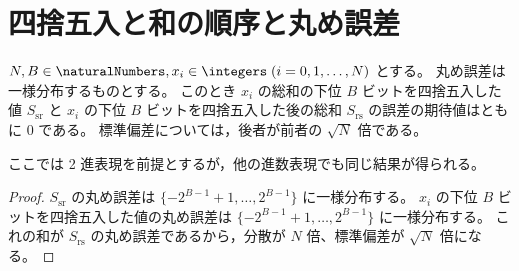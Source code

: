 \chapter{四捨五入と和の順序と丸め誤差}
    \begin{shadebox}
        $N,B\in\naturalNumbers,x_i\in\integers\;(i=0,1,\dots,N)$ とする。
        丸め誤差は一様分布するものとする。
        このとき $x_i$ の総和の下位 $B$ ビットを四捨五入した値 $S_\mathrm{sr}$ と $x_i$ の下位 $B$ ビットを四捨五入した後の総和 $S_\mathrm{rs}$ の誤差の期待値はともに 0 である。
        標準偏差については，後者が前者の $\sqrt{N}$ 倍である。
    \end{shadebox}
    ここでは 2 進表現を前提とするが，他の進数表現でも同じ結果が得られる。
    \begin{proof}
        $S_\mathrm{sr}$ の丸め誤差は $\{-2^{B-1}+1,\dots,2^{B-1}\}$ に一様分布する。
        $x_i$ の下位 $B$ ビットを四捨五入した値の丸め誤差は $\{-2^{B-1}+1,\dots,2^{B-1}\}$ に一様分布する。
        これの和が $S_\mathrm{rs}$ の丸め誤差であるから，分散が $N$ 倍、標準偏差が $\sqrt{N}$ 倍になる。
    \end{proof}